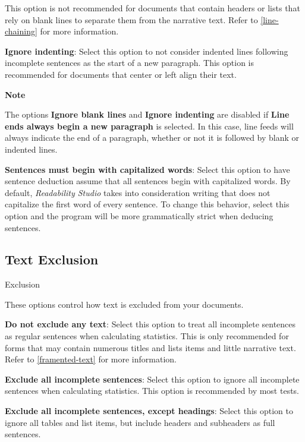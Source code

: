 \documentclass[
]{book}
\newenvironment{notesection}
    {
    \begin{tcolorbox}[colframe=mediumblue,colback=lightblue,coltext=mediumblue,arc=3mm]
    \faLightbulb[regular] \textbf{Note} \newline
    }
    {
    \end{tcolorbox}
    }
\newenvironment{optionssection}
    {
    \begin{tcolorbox}[colframe=lightgray,colback=ultralightgray,sharp corners=all,parbox=false]
    }
    {
    \end{tcolorbox}
    }
\newenvironment{optionssectiontitle}
    {
    \begin{tcolorbox}[colframe=lightgray,colback=lightgray]
    \bfseries
    }
    {
    \end{tcolorbox}
    }
\theoremstyle{definition}
\theoremstyle{definition}
\theoremstyle{definition}
\theoremstyle{definition}
\theoremstyle{remark}
\begin{document}
This option is not recommended for documents that contain headers or lists that rely on blank lines to separate them from the narrative text. Refer to \ref{line-chaining} for more information.

\textbf{Ignore indenting}: Select this option to not consider indented lines following incomplete sentences as the start of a new paragraph. This option is recommended for documents that center or left align their text.

\begin{notesection}
The options \textbf{Ignore blank lines} and \textbf{Ignore indenting} are disabled if \textbf{Line ends always begin a new paragraph} is selected. In this case, line feeds will always indicate the end of a paragraph, whether or not it is followed by blank or indented lines.

\end{notesection}

\textbf{Sentences must begin with capitalized words}: Select this option to have sentence deduction assume that all sentences begin with capitalized words. By default, \emph{Readability Studio} takes into consideration writing that does not capitalize the first word of every sentence. To change this behavior, select this option and the program will be more grammatically strict when deducing sentences.

\hypertarget{options-text-exclusion}{%
\subsection*{Text Exclusion}\label{options-text-exclusion}}

\begin{optionssection}

\begin{optionssectiontitle}
Exclusion

\end{optionssectiontitle}

These options control how text is excluded from your documents.

\textbf{Do not exclude any text}: Select this option to treat all incomplete sentences as regular sentences when calculating statistics. This is only recommended for forms that may contain numerous titles and lists items and little narrative text. Refer to \ref{framented-text} for more information.

\textbf{Exclude all incomplete sentences}: Select this option to ignore all incomplete sentences when calculating statistics. This option is recommended by most tests.

\textbf{Exclude all incomplete sentences, except headings}: Select this option to ignore all tables and list items, but include headers and subheaders as full sentences.

\end{optionssection}
\end{document}
